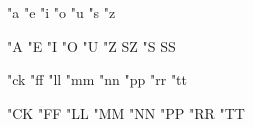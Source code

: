 

\unprotect

\startlanguagespecifics[\s!de]

  \installcompoundcharacter "a {\aumlaut\midworddiscretionary}
  \installcompoundcharacter "e {\eumlaut\midworddiscretionary}
  \installcompoundcharacter "i {\iumlaut\midworddiscretionary}
  \installcompoundcharacter "o {\oumlaut\midworddiscretionary}
  \installcompoundcharacter "u {\uumlaut\midworddiscretionary}
  \installcompoundcharacter "s {\ssharp}
  \installcompoundcharacter "z {\ssharp} 

  \installcompoundcharacter "A {\Aumlaut}
  \installcompoundcharacter "E {\Eumlaut}
  \installcompoundcharacter "I {\Iumlaut}
  \installcompoundcharacter "O {\Oumlaut}
  \installcompoundcharacter "U {\Uumlaut}
  \installcompoundcharacter "Z {SZ}
  \installcompoundcharacter "S {SS}

\stoplanguagespecifics

\startlanguagespecifics[\s!de]

  \installcompoundcharacter "ck {}
  \installcompoundcharacter "ff {}
  \installcompoundcharacter "ll {}
  \installcompoundcharacter "mm {}
  \installcompoundcharacter "nn {}
  \installcompoundcharacter "pp {}
  \installcompoundcharacter "rr {}
  \installcompoundcharacter "tt {}

  \installcompoundcharacter "CK {}
  \installcompoundcharacter "FF {}
  \installcompoundcharacter "LL {}
  \installcompoundcharacter "MM {}
  \installcompoundcharacter "NN {}
  \installcompoundcharacter "PP {}
  \installcompoundcharacter "RR {}
  \installcompoundcharacter "TT {}

\stoplanguagespecifics

